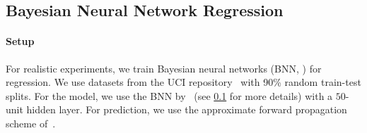 
% 







  \vspace{-0.05in}
\subsection{Bayesian Neural Network Regression}\label{section:bnn}
  \vspace{-0.05in}
\paragraph{Setup}
For realistic experiments, we train Bayesian neural networks (BNN, \citealt{neal_bayesian_1996}) for regression.
We use datasets from the UCI repository~\cite{Dua:2019} with 90\% random train-test splits.
For the model, we use the BNN by~\citet{pmlr-v37-hernandez-lobatoc15} (see \cref{section:bnn} for more details) with a \(50\)-unit hidden layer.
For prediction, we use the approximate forward propagation scheme of~\citet{pmlr-v37-hernandez-lobatoc15}.

